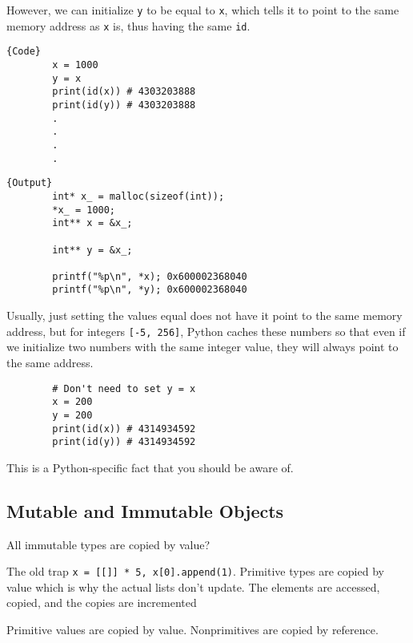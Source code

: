 \documentclass{article}
\begin{document}
      However, we can initialize \texttt{y} to be equal to \texttt{x}, which tells it to point to the same memory address as \texttt{x} is, thus having the same \texttt{id}. 

      \noindent\begin{minipage}{.5\textwidth}
      \begin{lstlisting}[]{Code}
        x = 1000 
        y = x 
        print(id(x)) # 4303203888 
        print(id(y)) # 4303203888 
        .
        .
        .
        .
      \end{lstlisting}
      \end{minipage}
      \hfill
      \begin{minipage}{.49\textwidth}
      \begin{lstlisting}[]{Output}
        int* x_ = malloc(sizeof(int)); 
        *x_ = 1000; 
        int** x = &x_; 

        int** y = &x_; 

        printf("%p\n", *x); 0x600002368040 
        printf("%p\n", *y); 0x600002368040 
      \end{lstlisting}
      \end{minipage}

      Usually, just setting the values equal does not have it point to the same memory address, but for integers \texttt{[-5, 256]}, Python caches these numbers so that even if we initialize two numbers with the same integer value, they will always point to the same address. 

      \begin{lstlisting}
        # Don't need to set y = x
        x = 200 
        y = 200 
        print(id(x)) # 4314934592 
        print(id(y)) # 4314934592
      \end{lstlisting}

      This is a Python-specific fact that you should be aware of. 

    \subsection{Mutable and Immutable Objects} 

      All immutable types are copied by value? 

      The old trap \texttt{x = [[]] * 5, x[0].append(1)}. 
      Primitive types are copied by value which is why the actual lists don't update. The elements are accessed, copied, and the copies are incremented  

      Primitive values are copied by value. Nonprimitives are copied by reference. 
\end{document}
